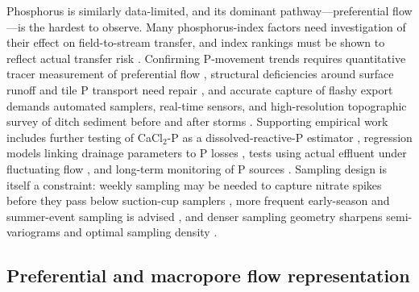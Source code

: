 \documentclass[11pt]{article}
\begin{document}
Phosphorus is similarly data-limited, and its dominant pathway---preferential
flow---is the hardest to observe. Many phosphorus-index factors need
investigation of their effect on field-to-stream transfer, and index rankings
must be shown to reflect actual transfer risk
\parencite{Bechmann2007,Beauchemin2003}. Confirming P-movement trends requires
quantitative tracer measurement of preferential flow
\parencite{Salazar2011,Tiemeyer2009}, structural deficiencies around surface
runoff and tile P transport need repair \parencite{Apostel2021}, and accurate
capture of flashy export demands automated samplers, real-time sensors, and
high-resolution topographic survey of ditch sediment before and after storms
\parencite{Dialameh2022,Warsta2014}. Supporting empirical work includes further
testing of CaCl$_2$-P as a dissolved-reactive-P estimator \parencite{McDowell2001b},
regression models linking drainage parameters to P losses \parencite{Morrison2013},
tests using actual effluent under fluctuating flow \parencite{Sanford2016}, and
long-term monitoring of P sources \parencite{Jia2012}. Sampling design is itself
a constraint: weekly sampling may be needed to capture nitrate spikes before
they pass below suction-cup samplers \parencite{Zotarelli2007}, more frequent
early-season and summer-event sampling is advised
\parencite{Kalita1998,Tiemeyer2009}, and denser sampling geometry sharpens
semi-variograms and optimal sampling density \parencite{GALLICHAND1992,Upadhyay2019}.

\subsection{Preferential and macropore flow representation}
\end{document}
